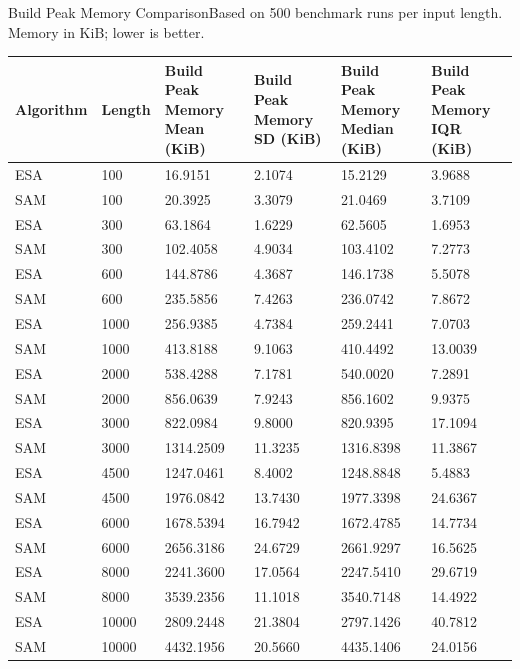 \begin{benchmarktable}{Build Peak Memory Comparison}{Based on 500 benchmark runs per input length. Memory in KiB; lower is better.}
\begin{tabularx}{\textwidth}{|X|X|X|X|X|X|}
\toprule
Algorithm & Length & Build Peak Memory Mean (KiB) & Build Peak Memory SD (KiB) & Build Peak Memory Median (KiB) & Build Peak Memory IQR (KiB) \\
\midrule
ESA & 100 & 16.9151 & 2.1074 & 15.2129 & 3.9688 \\
SAM & 100 & 20.3925 & 3.3079 & 21.0469 & 3.7109 \\
\hline
ESA & 300 & 63.1864 & 1.6229 & 62.5605 & 1.6953 \\
SAM & 300 & 102.4058 & 4.9034 & 103.4102 & 7.2773 \\
\hline
ESA & 600 & 144.8786 & 4.3687 & 146.1738 & 5.5078 \\
SAM & 600 & 235.5856 & 7.4263 & 236.0742 & 7.8672 \\
\hline
ESA & 1000 & 256.9385 & 4.7384 & 259.2441 & 7.0703 \\
SAM & 1000 & 413.8188 & 9.1063 & 410.4492 & 13.0039 \\
\hline
ESA & 2000 & 538.4288 & 7.1781 & 540.0020 & 7.2891 \\
SAM & 2000 & 856.0639 & 7.9243 & 856.1602 & 9.9375 \\
\hline
ESA & 3000 & 822.0984 & 9.8000 & 820.9395 & 17.1094 \\
SAM & 3000 & 1314.2509 & 11.3235 & 1316.8398 & 11.3867 \\
\hline
ESA & 4500 & 1247.0461 & 8.4002 & 1248.8848 & 5.4883 \\
SAM & 4500 & 1976.0842 & 13.7430 & 1977.3398 & 24.6367 \\
\hline
ESA & 6000 & 1678.5394 & 16.7942 & 1672.4785 & 14.7734 \\
SAM & 6000 & 2656.3186 & 24.6729 & 2661.9297 & 16.5625 \\
\hline
ESA & 8000 & 2241.3600 & 17.0564 & 2247.5410 & 29.6719 \\
SAM & 8000 & 3539.2356 & 11.1018 & 3540.7148 & 14.4922 \\
\hline
ESA & 10000 & 2809.2448 & 21.3804 & 2797.1426 & 40.7812 \\
SAM & 10000 & 4432.1956 & 20.5660 & 4435.1406 & 24.0156 \\
\bottomrule
\end{tabularx}
\end{benchmarktable}

